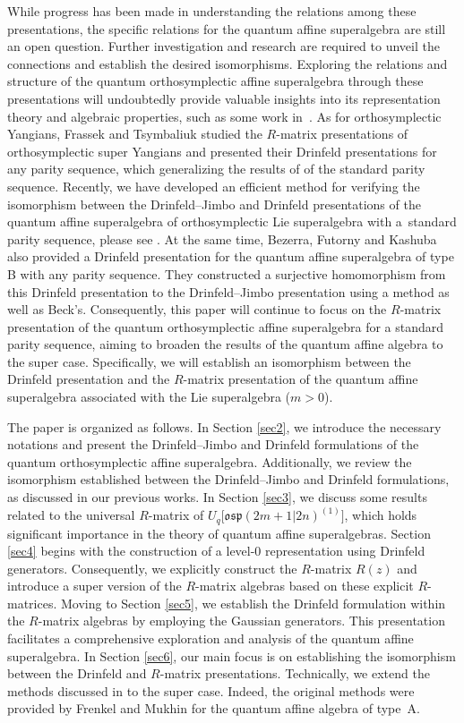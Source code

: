 \documentclass[pdftex]{sigma}
\numberwithin{equation}{section}
\begin{document}
While progress has been made in understanding the relations among these presentations, the specific relations for the quantum affine superalgebra are still an open question. Further investigation and research are required to unveil the connections and establish the desired isomorphisms. Exploring the relations and structure of the quantum orthosymplectic affine superalgebra through these presentations will undoubtedly provide valuable insights into its representation theory and algebraic properties, such as some work in~\cite{YZC2}. As for orthosymplectic Yangians, Frassek and Tsymbaliuk \cite{Frassek} studied the $R$-matrix presentations of orthosymplectic super Yangians and presented their Drinfeld presentations for any parity sequence, which
generalizing the results of \cite{AIM} of the standard parity sequence.
Recently, we have developed an efficient method for verifying the isomorphism between the Drinfeld--Jimbo and Drinfeld presentations of the quantum affine superalgebra of orthosymplectic Lie superalgebra with a~standard parity sequence, please see \cite{XWLHZ}. At the same time, Bezerra, Futorny and Kashuba \cite{Bezerra} also provided a Drinfeld presentation for the quantum affine superalgebra of type B with any parity sequence. They constructed a surjective homomorphism from this Drinfeld presentation to the Drinfeld--Jimbo presentation using a method as well as Beck's.
 Consequently, this paper will continue to focus on the $R$-matrix presentation of the quantum orthosymplectic affine superalgebra for a standard parity sequence, aiming to broaden the results of the quantum affine algebra to the super case. Specifically, we will establish an isomorphism between the Drinfeld presentation and the $R$-matrix presentation of the quantum affine superalgebra associated with the Lie superalgebra  ($m>0$).

The paper is organized as follows. In Section \ref{sec2}, we introduce the necessary notations and present the Drinfeld--Jimbo and Drinfeld formulations of the quantum orthosymplectic affine superalgebra. Additionally, we review the isomorphism established between the Drinfeld--Jimbo and Drinfeld formulations, as discussed in our previous works.
In Section \ref{sec3}, we discuss some results related to the universal $R$-matrix of $U_q\bigl[\mathfrak{osp}(2m+1|2n)^{(1)}\bigr]$, which holds significant importance in the theory of quantum affine superalgebras.
Section \ref{sec4} begins with the construction of a level-0 representation using Drinfeld generators. Consequently, we explicitly construct the $R$-matrix $R(z)$ and introduce a super version of the $R$-matrix algebras based on these explicit $R$-matrices.
Moving to Section \ref{sec5}, we establish the Drinfeld formulation within the $R$-matrix algebras by employing the Gaussian generators. This presentation facilitates a comprehensive exploration and analysis of the quantum affine superalgebra.
In Section \ref{sec6}, our main focus is on establishing the isomorphism between the Drinfeld and $R$-matrix presentations. Technically, we extend the methods discussed in \cite{JMA,JMAB} to the super case. Indeed, the original methods were provided by Frenkel and Mukhin \cite[Section 3.2]{EFEM} for the quantum affine algebra of type~A.
\end{document}
